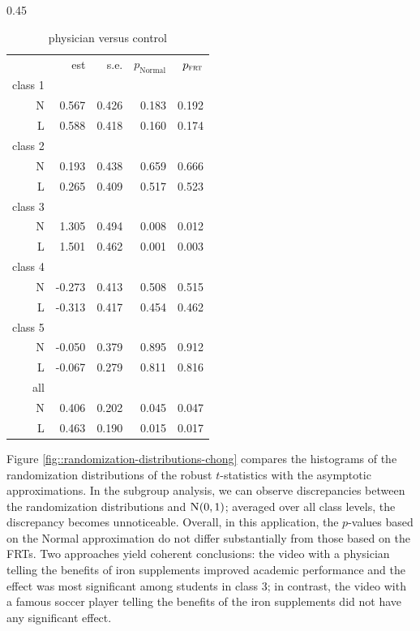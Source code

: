\begin{table}
\begin{subtable}[h]{0.45\textwidth} 
\caption{physician versus control}
    \begin{tabular}{rrrrr}
    \hline 
   &    est & s.e. &$p_\text{Normal}$ & $p_{\textsc{frt}}$ \\
       class 1& &&&\\
\textsc{N}  &  0.567 &0.426  &    0.183 &  0.192 \\
\textsc{L}   &   0.588& 0.418  &   0.160  & 0.174 \\
       class 2& &&&\\
\textsc{N}  &   0.193& 0.438 &     0.659 &  0.666 \\
\textsc{L}   &  0.265& 0.409   &   0.517  & 0.523 \\
       class 3& &&&\\
\textsc{N}  &  1.305& 0.494  &    0.008 &  0.012\\
\textsc{L}   &  1.501& 0.462   &   0.001  & 0.003 \\
       class 4& &&&\\
\textsc{N}  &  -0.273& 0.413  &    0.508 &  0.515 \\
\textsc{L}   &  -0.313& 0.417   &   0.454  & 0.462\\
       class 5& &&&\\
\textsc{N}  & -0.050 &0.379  &    0.895 &  0.912 \\
\textsc{L}   &  -0.067& 0.279  &    0.811 &  0.816 \\
       all& &&&\\
\textsc{N}  &  0.406 & 0.202   &   0.045 &  0.047\\
\textsc{L}   &    0.463 & 0.190   &   0.015  & 0.017 \\
\hline 
    \end{tabular}
\end{subtable}
\end{table}



Figure \ref{fig::randomization-distributions-chong} compares the histograms of the randomization distributions of the robust $t$-statistics with the asymptotic approximations. In the subgroup analysis, we can observe discrepancies between the randomization distributions and $\textsc{N}(0,1)$; averaged over all class levels, the discrepancy becomes unnoticeable. Overall, in this application, the $p$-values based on the Normal approximation do not differ substantially from those based on the FRTs. Two approaches yield coherent conclusions: the video with a physician telling the benefits of iron supplements improved academic performance and the effect was most significant among students in class 3; in contrast, the video with a famous soccer player telling the benefits of the iron supplements did not have any significant effect. 



